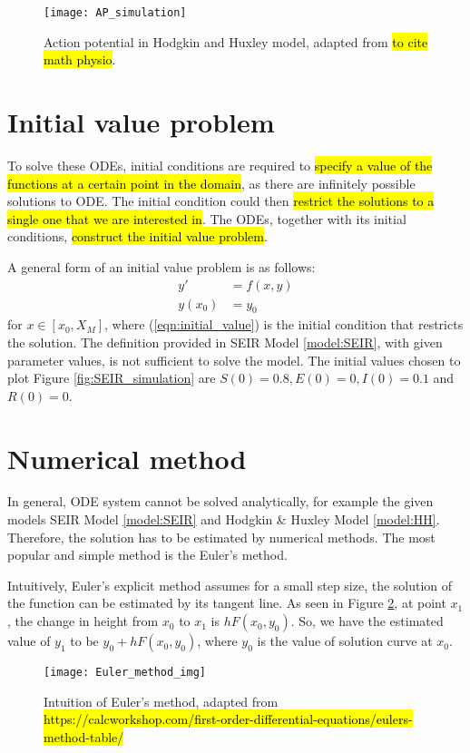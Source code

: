 \begin{figure}
\centering
    \texttt{[image: AP\_simulation]}
    \caption{Action potential in Hodgkin and Huxley model, adapted from \hl{to cite math physio}.}
    \label{fig:AP_simulation}
\end{figure}

\section{Initial value problem}
To solve these ODEs, initial conditions are required to \hl{specify a value of the functions at a certain point in the domain}, as there are infinitely possible solutions to ODE. The initial condition could then \hl{restrict the solutions to a single one that we are interested in}. The ODEs, together with its initial conditions, \hl{construct the initial value problem}.

A general form of an initial value problem is as follows: 
\begin{align}
    y'&=f(x,y)\\
    y(x_0) &= y_0 \label{eqn:initial_value}
\end{align}
for $x \in [x_0, X_M]$, where (\ref{eqn:initial_value}) is the initial condition that restricts the solution. The definition provided in SEIR Model \ref{model:SEIR}, with given parameter values, is not sufficient to solve the model. The initial values chosen to plot Figure \ref{fig:SEIR_simulation} are $S(0)=0.8, E(0)=0, I(0)=0.1$ and $R(0)=0$.

\section{Numerical method}
In general, ODE system cannot be solved analytically, for example the given models SEIR Model \ref{model:SEIR} and Hodgkin \& Huxley Model \ref{model:HH}. Therefore, the solution has to be estimated by numerical methods. The most popular and simple method is the Euler's method.

Intuitively, Euler's explicit method assumes for a small step size, the solution of the function can be estimated by its tangent line. As seen in Figure \ref{fig:Euler_method}, at point $x_1$, the change in height from $x_0$ to $x_1$ is $hF(x_0,y_0)$. So, we have the estimated value of $y_1$ to be $y_0 + hF(x_0,y_0)$, where $y_0$ is the value of solution curve at $x_0$.

\begin{figure}
\centering
    \texttt{[image: Euler\_method\_img]}
    \caption{Intuition of Euler's method, adapted from \hl{https://calcworkshop.com/first-order-differential-equations/eulers-method-table/}}
    \label{fig:Euler_method}
\end{figure}

